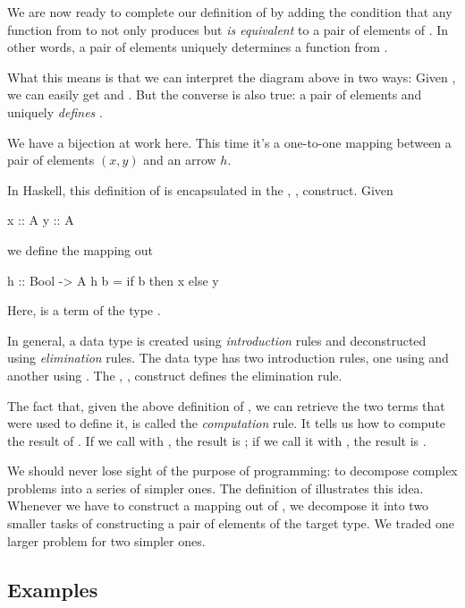 \documentclass[DaoFP]{subfiles}
\begin{document}
We are now ready to complete our definition of  by adding the condition that any function from  to  not only produces but \emph{is equivalent} to a pair of elements of . In other words, a pair of elements uniquely determines a function from . 

What this means is that we can interpret the diagram above in two ways: Given , we can easily get  and . But the converse is also true: a pair of elements  and  uniquely \emph{defines} .

We have a bijection at work here. This time it's a one-to-one mapping between a pair of elements $(x, y)$ and an arrow $h$. 

In Haskell, this definition of  is encapsulated in the , ,  construct. Given
\begin{haskell}
x :: A
y :: A
\end{haskell}
we define the mapping out
\begin{haskell}
h :: Bool -> A
h b = if b then x else y
\end{haskell}
Here,  is a term of the type . 

In general, a data type is created using \emph{introduction} rules and deconstructed using \emph{elimination} rules. The  data type has two introduction rules, one using  and another using . The , ,  construct defines the elimination rule. 

The fact that, given the above definition of , we can retrieve the two terms that were used to define it, is called the \emph{computation} rule. It tells us how to compute the result of . If we call  with , the result is ; if we call it with , the result is .

We should never lose sight of the purpose of programming: to decompose complex problems into a series of simpler ones. The definition of  illustrates this idea. Whenever we have to construct a mapping out of , we decompose it into two smaller tasks of constructing a pair of elements of the target type. We traded one larger problem for two simpler ones.

\subsection{Examples}
\end{document}
